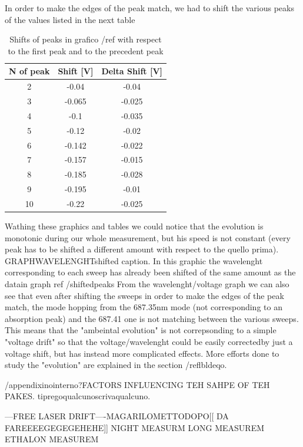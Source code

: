 In order to make the edges of the peak match, we had to shift the various peaks of the values listed in the next table
\begin{table}[!htbp]
\begin{tabular}{|c|c|c|}
\hline
N of peak & Shift [V] & Delta Shift [V] \\ \hline
2 & -0.04 & -0.04 \\ \hline
3 & -0.065 & -0.025 \\ \hline
4 & -0.1 & -0.035 \\ \hline
5 & -0.12 & -0.02 \\ \hline
6 & -0.142 & -0.022 \\ \hline
7 & -0.157 & -0.015 \\ \hline
8 & -0.185 & -0.028 \\ \hline
9 & -0.195 & -0.01 \\ \hline
10 & -0.22 & -0.025 \\ \hline
\end{tabular}
\caption{Shifts of peaks in grafico /ref with respect to the first peak and to the precedent peak}
\label{peakshifts}
\end{table}

Wathing these graphics  and tables we could notice that the evolution is monotonic during our whole measurement, but his speed is not constant 
(every peak has to be shifted a different amount with respect to the quello prima).
GRAPHWAVELENGHTshifted
caption. In this graphic the wavelenght corresponding to each sweep has already been shifted of the same amount as the datain graph ref /shiftedpeaks
From the wavelenght/voltage graph we can also see that even after shifting the sweeps in order to make the edges of the peak match, the mode hopping from the 687.35nm 
mode (not corresponding to an absorption peak) and the 687.41 one is not matching between the various sweeps. This means that the "ambeintal evolution" is not 
correpsonding to a  simple "voltage drift" so that the voltage/wavelenght could be easily correctedby just a voltage shift, but has instead more complicated effects.
More efforts done to study the "evolution" are explained in the section /reflbldeqo.

/appendixinointerno?FACTORS INFLUENCING TEH SAHPE OF TEH PAKES.
tipregoqualcunoscrivaqualcuno.





---FREE LASER DRIFT----MAGARILOMETTODOPO[[  DA FAREEEEGEGEGEHEHE]]
NIGHT MEASURM
LONG MEASUREM
ETHALON MEASUREM

